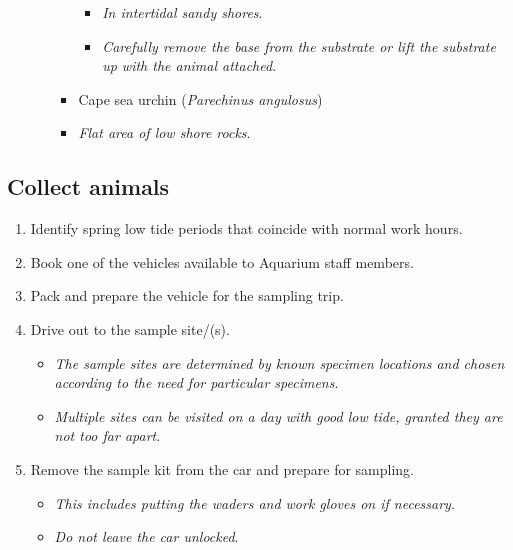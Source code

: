 \documentclass[
  12pt,
]{report}
\providecommand{\tightlist}{%
  \setlength{\itemsep}{0pt}\setlength{\parskip}{0pt}}\usepackage{longtable,booktabs,array}
\begin{document}
\begin{itemize}
\begin{itemize}
\begin{itemize}
      \begin{itemize}
      \tightlist
      \item
        \emph{In intertidal sandy shores}.
      \item
        \emph{Carefully remove the base from the substrate or lift the
        substrate up with the animal attached}.
      \end{itemize}
    \item
      Cape sea urchin (\emph{Parechinus angulosus})
    \item
      \emph{Flat area of low shore rocks}.
    \end{itemize}
  \end{itemize}
\end{itemize}

\hypertarget{collect-animals}{%
\subsection{Collect animals}\label{collect-animals}}

\begin{enumerate}
\def\labelenumi{\arabic{enumi}.}
\tightlist
\item
  Identify spring low tide periods that coincide with normal work hours.
\item
  Book one of the vehicles available to Aquarium staff members.
\item
  Pack and prepare the vehicle for the sampling trip.
\item
  Drive out to the sample site/(s).

  \begin{itemize}
  \tightlist
  \item
    \emph{The sample sites are determined by known specimen locations
    and chosen according to the need for particular specimens}.
  \item
    \emph{Multiple sites can be visited on a day with good low tide,
    granted they are not too far apart}.
  \end{itemize}
\item
  Remove the sample kit from the car and prepare for sampling.

  \begin{itemize}
  \tightlist
  \item
    \emph{This includes putting the waders and work gloves on if
    necessary}.
  \item
    \emph{Do not leave the car unlocked}.
  \end{itemize}
\end{enumerate}
\end{document}
